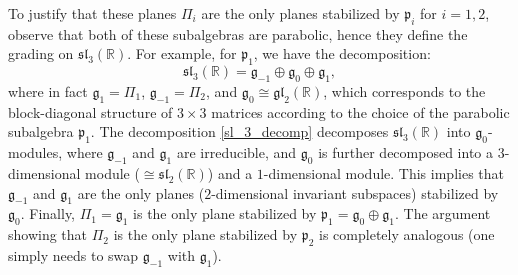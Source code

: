 \documentclass[11pt,letterpaper]{amsart}
\numberwithin{equation}{section}
\begin{document}
To justify that these planes $\Pi_i$ are the only planes stabilized by $\mathfrak{p}_i$ for $i=1,2$, observe that both of these subalgebras are parabolic, hence they define the grading on $\mathfrak{sl}_3(\mathbb{R})$. For example, for $\mathfrak{p}_1$, we have the decomposition:
\begin{equation}
\label{sl_3_decomp}
\mathfrak{sl}_3(\mathbb{R}) = \mathfrak{g}_{-1} \oplus \mathfrak{g}_0 \oplus \mathfrak{g}_1,
\end{equation}
where in fact $\mathfrak{g}_{1} = \Pi_1$, $\mathfrak{g}_{-1} = \Pi_2$, and $\mathfrak{g}_0 \cong \mathfrak{gl}_2(\mathbb{R})$, which corresponds to the block-diagonal structure of $3\times 3$ matrices according to the choice of the parabolic subalgebra $\mathfrak{p}_1$. 
The decomposition \eqref{sl_3_decomp} decomposes $\mathfrak{sl}_3(\mathbb{R})$ into $\mathfrak{g}_0$-modules, where $\mathfrak{g}_{-1}$ and $\mathfrak{g}_{1}$ are irreducible, and $\mathfrak{g}_0$ is further decomposed into a $3$-dimensional module ($\cong \mathfrak{sl}_2(\mathbb{R})$) and a $1$-dimensional module. This implies that $\mathfrak{g}_{-1}$ and $\mathfrak{g}_{1}$ are the only planes ($2$-dimensional invariant subspaces) stabilized by $\mathfrak{g}_0$. 
Finally, $\Pi_1 = \mathfrak{g}_{1}$ is the only plane stabilized by $\mathfrak{p}_1 = \mathfrak{g}_0 \oplus \mathfrak{g}_{1}$. The argument showing that $\Pi_2$ is the only plane stabilized by $\mathfrak{p}_2$ is completely analogous (one simply needs to swap $\mathfrak{g}_{-1}$ with $\mathfrak{g}_1$).
\end{document}
